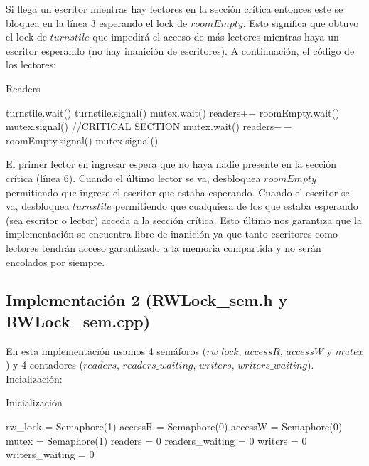 Si llega un escritor mientras hay lectores en la sección crítica entonces este se bloquea en la línea 3 esperando el lock de $roomEmpty$. Esto significa que obtuvo el lock de $turnstile$ que impedirá el acceso de más lectores mientras haya un escritor esperando (no hay inanición de escritores). A continuación, el código de los lectores:

\begin{algorithm}[H]
\caption{Readers}\label{ej1}
\begin{algorithmic}[1]
	\State turnstile.wait()
	\State turnstile.signal()
	\State mutex.wait()
	\State readers++
		\State roomEmpty.wait()
	\EndIf
	\State mutex.signal()
	\State //CRITICAL SECTION
	\State mutex.wait()
	\State readers$--$
		\State roomEmpty.signal()
	\EndIf
	\State mutex.signal()
\EndProcedure
\end{algorithmic}
\end{algorithm}

El primer lector en ingresar espera que no haya nadie presente en la sección crítica (línea 6). Cuando el último lector se va, desbloquea $roomEmpty$ permitiendo que ingrese el escritor que estaba esperando. Cuando el escritor se va, desbloquea $turnstile$ permitiendo que cualquiera de los que estaba esperando (sea escritor o lector) acceda a la sección crítica. Esto último nos garantiza que la implementación se encuentra libre de inanición ya que tanto escritores como lectores tendrán acceso garantizado a la memoria compartida y no serán encolados por siempre.

\subsection{Implementación 2 (RWLock\_sem.h y RWLock\_sem.cpp)}

En esta implementación usamos 4 semáforos ($rw\_lock$, $accessR$, $accessW$ y $mutex$) y 4 contadores ($readers$, $readers\_waiting$, $writers$, $writers\_waiting$).
Incialización:

\begin{algorithm}[H]
\caption{Inicialización}\label{ej1}
\begin{algorithmic}[1]
	\State rw\_lock = Semaphore(1)
	\State accessR = Semaphore(0)
	\State accessW = Semaphore(0)
	\State mutex = Semaphore(1)
	\State readers = 0
	\State readers\_waiting = 0
	\State writers = 0
	\State writers\_waiting = 0
\EndProcedure
\end{algorithmic}
\end{algorithm}

